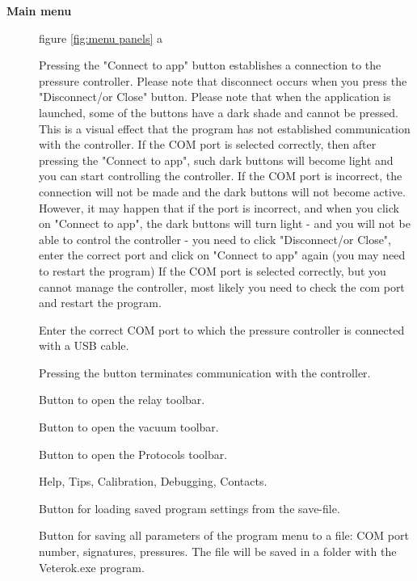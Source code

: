 \documentclass[twoside, 12pt, a4paper]{refart}
\begin{document}
   
    \begin{description}
    \item[\textbf{Main menu}] figure \ref{fig:menu panels} a
    
       Pressing the "Connect to app" button establishes a connection to the pressure controller. Please note that disconnect occurs when you press the "Disconnect/or Close" button.
\newline Please note that when the application is launched, some of the buttons have a dark shade and cannot be pressed. This is a visual effect that the program has not established communication with the controller.
\newline If the COM port is selected correctly, then after pressing the "Connect to app", such dark buttons will become light and you can start controlling the controller.
\newline If the COM port is incorrect, the connection will not be made and the dark buttons will not become active. However, it may happen that if the port is incorrect, and when you click on "Connect to app", the dark buttons will turn light - and you will not be able to control the controller - you need to click "Disconnect/or Close", enter the correct port and click on "Connect to app" again (you may need to restart the program)
\newline If the COM port is selected correctly, but you cannot manage the controller, most likely you need to check the com port and restart the program.
      
       Enter the correct COM port to which the pressure controller is connected with a USB cable.
      
       Pressing the button terminates communication with the controller.
      
       Button to open the relay toolbar.
      
       Button to open the vacuum toolbar.
      
       Button to open the Protocols toolbar.
      
       Help, Tips, Calibration, Debugging, Contacts.  
          
       Button for loading saved program settings from the save-file.  
      
       Button for saving all parameters of the program menu to a file: COM port number, signatures, pressures. The file will be saved in a folder with the Veterok.exe program.
      

\end{description}
\end{document}
